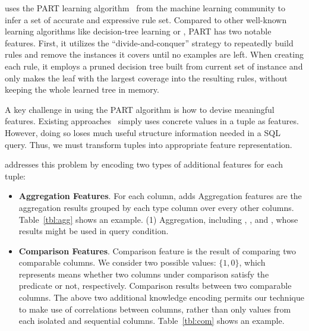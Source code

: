 \ourtool uses the PART learning algorithm~\cite{Frank:1998} from
the machine learning community to infer a set of accurate and
expressive rule set. Compared to other well-known learning algorithms
like decision-tree learning or , PART has two
notable features. 
First, it utilizes the ``divide-and-conquer'' strategy to repeatedly
build rules and remove the instances it covers until no examples are left.
When creating each rule, it employs a pruned decision tree built from
current set of instance and only makes the leaf with the largest coverage
into the resulting rules, without keeping the whole learned tree in memory.

A key challenge in using the PART algorithm is how to devise meaningful
features. Existing approaches~\cite{} simply uses concrete values in a tuple
as features. However, doing so loses much useful structure information
needed in a SQL query.
Thus, we must transform tuples into appropriate feature representation.

\ourtool addresses this problem by encoding two types of
additional features for each tuple:

\begin{itemize}

\item {\textbf{Aggregation Features}}. For each column, \ourtool
adds 
Aggregation
features are the aggregation results grouped by each  type column
over every other columns. Table~\ref{tbl:agg} shows an example.
(1) Aggregation, including , ,
 and , whose results might be used in query condition.


\item {\textbf{Comparison Features}}. Comparison
feature is the result of comparing two comparable columns. We
consider two possible values:  $\{1, 0\}$,  which represents
means whether two columns under comparison satisfy the predicate or not, respectively.
Comparison results between two comparable columns.
The above two additional knowledge encoding permits our technique
to make use of correlations between columns, rather than only values
from each isolated and sequential columns.
Table~\ref{tbl:com} shows an example.


\end{itemize}

